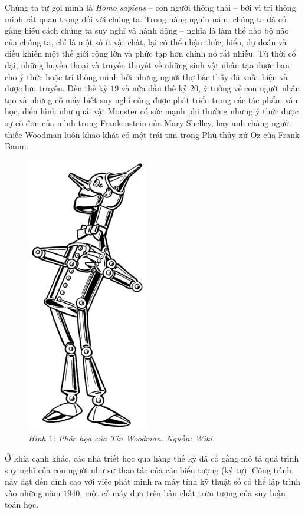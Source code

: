 \begin{multicols}{2}
	Chúng ta tự gọi mình là \textit{Homo sapiens} -- con người thông thái -- bởi vì trí thông minh rất quan trọng đối với chúng ta. Trong hàng nghìn năm, chúng ta đã cố gắng hiểu cách chúng ta suy nghĩ và hành động -- nghĩa là làm thế nào bộ não của chúng ta, chỉ là một số ít vật chất, lại có thể nhận thức, hiểu, dự đoán và điều khiển một thế giới rộng lớn và phức tạp hơn chính nó rất nhiều. Từ thời cổ đại, những huyền thoại và truyền thuyết về những sinh vật nhân tạo được ban cho ý thức hoặc trí thông minh bởi những người thợ bậc thầy đã xuất hiện và được lưu truyền. Đến thế kỷ $19$ và nửa đầu thế kỷ $20$, ý tưởng về con người nhân tạo và những cỗ máy biết suy nghĩ cũng được phát triển trong các tác phẩm văn học, điển hình như quái vật Monster có sức mạnh phi thường nhưng ý thức được sự cô đơn của mình trong Frankenstein của Mary Shelley, hay anh chàng người thiếc Woodman luôn khao khát có một trái tim trong Phù thủy xứ Oz của Frank Baum.
	\begin{figure}[H]
		\vspace*{-5pt}
		\centering
		\captionsetup{labelformat= empty, justification=centering}
		\includegraphics[width= 0.4\linewidth]{Tin_Woodman.png}
		\caption{\small\textit{\color{cackithi}Hình $1$: Phác họa của Tin Woodman. Nguồn: Wiki.}}
		\vspace*{-10pt}
	\end{figure}
	Ở khía cạnh khác, các nhà triết học qua hàng thế kỷ đã cố gắng mô tả quá trình suy nghĩ của con người như sự thao tác của các biểu tượng (ký tự). Công trình này đạt đến đỉnh cao với việc phát minh ra máy tính kỹ thuật số có thể lập trình vào những năm $1940$, một cỗ máy dựa trên bản chất trừu tượng của suy luận toán học. 

\end{multicols}
